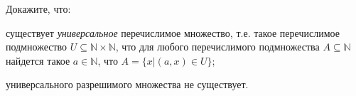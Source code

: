 Докажите, что:
\begin{enumcyr}
    \item существует \textit{универсальное} перечислимое множество, т.е. такое перечислимое подмножество $U \subseteq
	    \mathbb{N} \times \mathbb{N}$, что для любого перечислимого подмножества $A \subseteq \mathbb{N}$ найдется такое $a
        \in \mathbb{N}$, что $A = \{x | (a, x) \in U\}$;
    \item универсального разрешимого множества не существует.
\end{enumcyr}